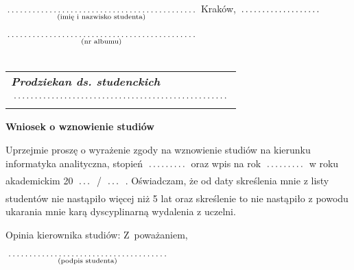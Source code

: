 \documentclass[a4paper,8pt]{article}
\newcommand{\fillField}[2]{
    $\underset{\text{#1}}{\parbox[t]{#2}{\dotfill}}$
}
\begin{document}
\noindent
\fillField{(imię i nazwisko studenta)}{7cm} \hfill Kraków, \fillField{}{3cm} \\\\
\fillField{(nr albumu)}{7cm} \\\\


\phantom{a}\hfill
\begin{tabular}[c]{@{}l@{}}
\textit{\textbf{Prodziekan ds. studenckich}} \\\\
\fillField{}{8cm}
\end{tabular}

\vskip 2.0cm

\begin{center}
{\Large \textbf{Wniosek o wznowienie studiów}}
\end{center}

\vskip 0.5cm

Uprzejmie proszę o wyrażenie zgody na wznowienie studiów na kierunku informatyka analityczna, stopień \fillField{}{1.5cm} oraz wpis na rok \fillField{}{1.5cm} w roku akademickim 20\fillField{}{0.6cm}/\fillField{}{0.6cm}. Oświadczam, że od daty skreślenia mnie z listy studentów nie nastąpiło więcej niż 5 lat oraz skreślenie to nie nastąpiło z powodu ukarania mnie karą dyscyplinarną wydalenia z uczelni.

\vskip 2.0cm

\noindent
Opinia kierownika studiów: \hspace{\fill} Z~poważaniem, \hspace{2.8cm} \\\\
\null\hfill\fillField{(podpis studenta)}{6cm}%
\vskip 4.0cm
\end{document}
